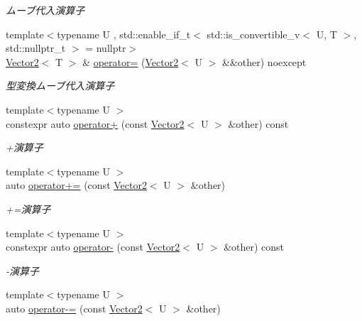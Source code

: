 \begin{DoxyCompactItemize}
\begin{DoxyCompactList}\small\item\em ムーブ代入演算子 \end{DoxyCompactList}\item 
{\footnotesize template$<$typename U , std\+::enable\+\_\+if\+\_\+t$<$ std\+::is\+\_\+convertible\+\_\+v$<$ U, T $>$, std\+::nullptr\+\_\+t $>$  = nullptr$>$ }\\\mbox{\hyperlink{classsaki_1_1_vector2}{Vector2}}$<$ T $>$ \& \mbox{\hyperlink{classsaki_1_1_vector2_acd72a6247e6c425fab7320457fb73e5e}{operator=}} (\mbox{\hyperlink{classsaki_1_1_vector2}{Vector2}}$<$ U $>$ \&\&other) noexcept
\begin{DoxyCompactList}\small\item\em 型変換ムーブ代入演算子 \end{DoxyCompactList}\item 
{\footnotesize template$<$typename U $>$ }\\constexpr auto \mbox{\hyperlink{classsaki_1_1_vector2_a858afb6fe807d543ca5b266404226cd5}{operator+}} (const \mbox{\hyperlink{classsaki_1_1_vector2}{Vector2}}$<$ U $>$ \&other) const
\begin{DoxyCompactList}\small\item\em +演算子 \end{DoxyCompactList}\item 
{\footnotesize template$<$typename U $>$ }\\auto \mbox{\hyperlink{classsaki_1_1_vector2_aa76ccb2d2228441d510dca7781f785d3}{operator+=}} (const \mbox{\hyperlink{classsaki_1_1_vector2}{Vector2}}$<$ U $>$ \&other)
\begin{DoxyCompactList}\small\item\em +=演算子 \end{DoxyCompactList}\item 
{\footnotesize template$<$typename U $>$ }\\constexpr auto \mbox{\hyperlink{classsaki_1_1_vector2_a4be4c970957e552bdd98fa37ef4f14df}{operator-\/}} (const \mbox{\hyperlink{classsaki_1_1_vector2}{Vector2}}$<$ U $>$ \&other) const
\begin{DoxyCompactList}\small\item\em -\/演算子 \end{DoxyCompactList}\item 
{\footnotesize template$<$typename U $>$ }\\auto \mbox{\hyperlink{classsaki_1_1_vector2_aaf222bfb3a2e02a1570ce2e90c41fdd0}{operator-\/=}} (const \mbox{\hyperlink{classsaki_1_1_vector2}{Vector2}}$<$ U $>$ \&other)

\end{DoxyCompactItemize}
